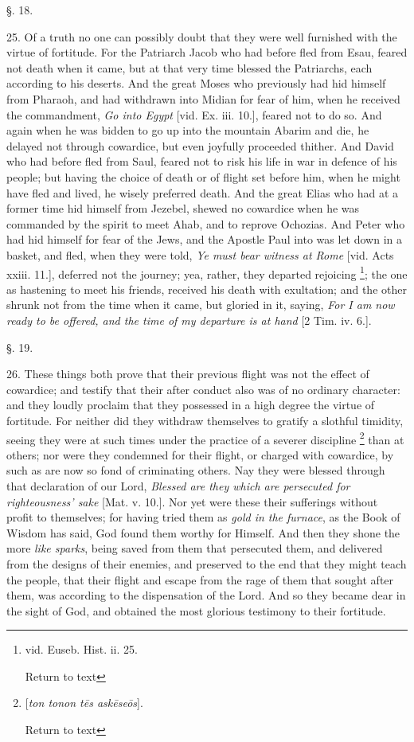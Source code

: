 §. 18.

25. Of a truth no one can possibly doubt that
they were well furnished with the virtue of fortitude. For the
Patriarch Jacob who had before fled from Esau, feared not death when
it came, but at that very time blessed the Patriarchs, each according
to his deserts. And the great Moses who previously had hid himself
from Pharaoh, and had withdrawn into Midian for fear of him, when he
received the commandment, \emph{Go into Egypt} [vid. Ex. iii. 10.],
feared not to do so. And again when he was bidden to go up into the
mountain Abarim and die, he delayed not through cowardice, but even
joyfully proceeded thither. And David who had before fled from Saul,
feared not to risk his life in war in defence of his people; but
having the choice of death or of flight set before him, when he might
have fled and lived, he wisely preferred death. And the great Elias
who had at a former time hid himself from Jezebel, shewed no cowardice
when he was commanded by the spirit to meet Ahab, and to reprove
Ochozias. And Peter who had hid himself for fear of the Jews, and the
Apostle Paul into was let down in a basket, and fled, when they were
told, \emph{Ye must bear witness at Rome} [vid. Acts xxiii. 11.],
deferred not the journey; yea, rather, they departed rejoicing \footnote{vid. Euseb. Hist. ii. 25.

Return to text}; the one as hastening to meet his friends, received his death with
exultation; and the other shrunk not from the time when it came, but
gloried in it, saying, \emph{For I am now ready to be offered, and the
time of my departure is at hand} [2 Tim. iv. 6.].

§. 19.

26. These things both prove that their previous
flight was not the effect of cowardice; and testify that their after
conduct also was of no ordinary character: and they loudly proclaim
that they possessed in a high degree the virtue of fortitude. For
neither did they withdraw themselves to gratify a slothful timidity,
seeing they were at such times under the practice of a severer
discipline \footnote{[\emph{ton tonon t\={e}s ask\={e}se\={o}s}].

Return to text} than at others; nor were
they condemned for their flight, or charged with cowardice, by such as
are now so fond of criminating others. Nay they were blessed through
that declaration of our Lord, \emph{Blessed are they which are persecuted
for righteousness' sake} [Mat. v. 10.]. Nor yet were these their
sufferings without profit to themselves; for having tried them as \emph{gold
in the furnace}, as the Book of Wisdom has said, God found them
worthy for Himself. And then they shone the more \emph{like sparks},
being saved from them that persecuted them, and delivered from the
designs of their enemies, and preserved to the end that they might
teach the people, that their flight and escape from the rage of them
that sought after them, was according to the dispensation of the Lord.
And so they became dear in the sight of God, and obtained the most
glorious testimony to their fortitude.


